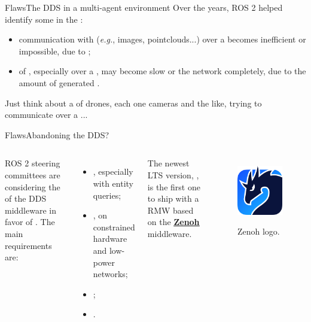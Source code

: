 \begin{frame}{Flaws}{The DDS in a multi-agent environment}
	Over the years, ROS 2 helped identify some  in the :
	\begin{itemize}
		\item communication with  (\emph{e.g.}, images, pointclouds...) over a  becomes inefficient or impossible, due to ;
		\item {} of , especially over a , may become slow or  the network completely, due to the amount of generated .
	\end{itemize}
	Just think about a  of drones, each one cameras and the like, trying to communicate over a ...
\end{frame}
\begin{frame}{Flaws}{Abandoning the DDS?}
	\begin{columns}
		ROS 2 steering committees are considering the  of the DDS middleware in favor of . The main requirements are:
		\begin{itemize}
			\item {}, especially with entity queries;
			\item {}, on constrained hardware and low-power networks;
			\item {};
			\item {}.
		\end{itemize}
		\bigskip
		The newest LTS version, , is the first one to ship with a RMW based on the \href{https://zenoh.io/}{\color{blue}\textbf{\underline{Zenoh}}} middleware.

		\begin{figure}
			\centering
			\includegraphics[width=.65\textwidth]{zenoh}
			\label{fig:zenoh}
			\caption{Zenoh logo.}
		\end{figure}
	\end{columns}
\end{frame}

